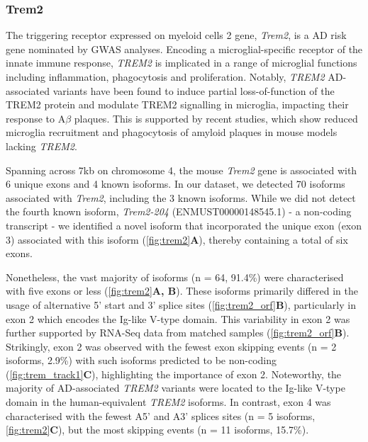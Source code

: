 \newpage
\subsubsection{Trem2}
\label{ch5: trem2_annotation}
The triggering receptor expressed on myeloid cells 2 gene, \textit{Trem2}, is a AD risk gene nominated by GWAS analyses. Encoding a microglial-specific receptor of the innate immune response, \textit{TREM2} is implicated in a range of microglial functions including inflammation, phagocytosis and proliferation. Notably, \textit{TREM2} AD-associated variants have been found to induce partial loss-of-function of the TREM2 protein and modulate TREM2 signalling in microglia, impacting their response to A$\beta$ plaques\cite{Kober2016, Guerreiro2013a}. This is supported by recent studies, which show reduced microglia recruitment and phagocytosis of amyloid plaques in mouse models lacking \textit{TREM2}\cite{Wang2015a}. 

Spanning across 7kb on chromosome 4, the mouse \textit{Trem2} gene is associated with 6 unique exons and 4 known isoforms. In our dataset, we detected 70 isoforms associated with \textit{Trem2}, including the 3 known isoforms. While we did not detect the fourth known isoform, \textit{Trem2-204} (ENMUST00000148545.1) - a non-coding transcript - we identified a novel isoform that incorporated the unique exon (exon 3) associated with this isoform (\cref{fig:trem2}\textbf{A}), thereby containing a total of six exons.   

Nonetheless, the vast majority of isoforms (n = 64, 91.4\%) were characterised with five exons or less (\cref{fig:trem2}\textbf{A, B}). These isoforms primarily differed in the usage of alternative 5' start and 3' splice sites (\cref{fig:trem2_orf}\textbf{B}), particularly in exon 2 which encodes the Ig-like V-type domain. This variability in exon 2 was further supported by RNA-Seq data from matched samples (\cref{fig:trem2_orf}\textbf{B}). Strikingly, exon 2 was observed with the fewest exon skipping events (n = 2 isoforms, 2.9\%) with such isoforms predicted to be non-coding (\cref{fig:trem_track1}\textbf{C}), highlighting the importance of exon 2. Noteworthy, the majority of AD-associated \textit{TREM2} variants were located to the Ig-like V-type domain in the human-equivalent \textit{TREM2} isoforms. In contrast, exon 4 was characterised with the fewest A5' and A3' splices sites (n = 5 isoforms, \cref{fig:trem2}\textbf{C}), but the most skipping events (n = 11 isoforms, 15.7\%). 

